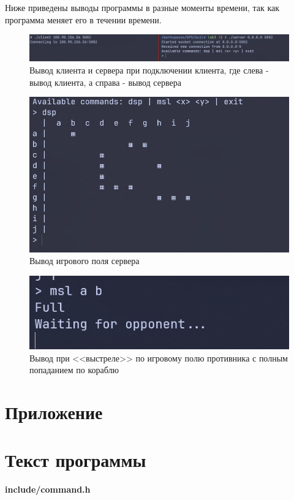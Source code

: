 Ниже приведены выводы программы в разные моменты времени, так как программа
меняет его в течении времени.

\begin{figure}[H]
    \centering
    \includegraphics[width=0.9\linewidth]{images/lab3_connect.png}
    \caption{Вывод клиента и сервера при подключении клиента, где слева - вывод клиента, а справа - вывод сервера}
    \label{fig:connection}
\end{figure}

\begin{figure}[H]
    \centering
    \includegraphics[width=0.5\linewidth]{images/lab3_dsp.png}
    \caption{Вывод игрового поля сервера}
    \label{fig:dsp}
\end{figure}

\begin{figure}[H]
    \centering
    \includegraphics[width=0.3\linewidth]{images/lab3_msl.png}
    \caption{Вывод при <<выстреле>> по игровому полю противника с полным попаданием по кораблю}
    \label{fig:msl}
\end{figure}

\newpage

\appendix

\section*{Приложение}
\section*{Текст программы}

\textbf{include/command.h}

